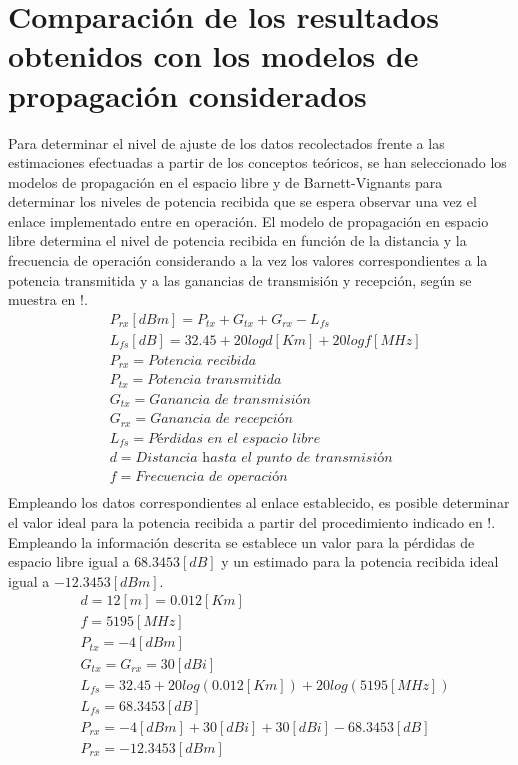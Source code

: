 \documentclass[conference]{IEEEtran}
\begin{document}
\section{Comparación de los resultados obtenidos con los modelos de propagación considerados}
Para determinar el nivel de ajuste de los datos recolectados frente a las estimaciones efectuadas a partir de 
los conceptos teóricos, se han seleccionado los modelos de propagación en el espacio libre y de Barnett-Vignants
para determinar los niveles de potencia recibida que se espera observar una vez el enlace implementado entre en operación.
El modelo de propagación en espacio libre determina el nivel de potencia recibida en función de la distancia y la 
frecuencia de operación considerando a la vez los valores correspondientes a la potencia transmitida y a las ganancias
de transmisión y recepción, según se muestra en !. 
\begin{equation}
    \label{eq:Eq4}
    \begin{aligned}
        &P_{rx}[dBm] = P_{tx} + G_{tx} + G_{rx} - L_{fs}\\
        &L_{fs}[dB] = 32.45+20logd[Km]+20logf[MHz]\\
        &P_{rx} = \textit{Potencia recibida}\\
        &P_{tx} = \textit{Potencia transmitida}\\
        &G_{tx} = \textit{Ganancia de transmisión}\\
        &G_{rx} = \textit{Ganancia de recepción}\\
        &L_{fs} = \textit{Pérdidas en el espacio libre}\\
        &d = \textit{Distancia hasta el punto de transmisión}\\
        &f = \textit{Frecuencia de operación}\\
    \end{aligned}
\end{equation}
Empleando los datos correspondientes al enlace establecido, es posible determinar el valor ideal para la potencia recibida 
a partir del procedimiento indicado en !. Empleando la información descrita se establece un valor para la pérdidas de espacio libre
igual a $68.3453[dB]$ y un estimado para la potencia recibida ideal igual a $-12.3453[dBm]$.
\begin{equation}
    \label{eq:Eq5}
    \begin{aligned}
        &d = 12[m] = 0.012[Km]\\
        &f = 5195[MHz]\\
        &P_{tx} = -4[dBm]\\
        &G_{tx} = G_{rx} = 30[dBi]\\
        &L_{fs} = 32.45+20log(0.012[Km])+20log(5195[MHz])\\
        &L_{fs} = 68.3453[dB]\\
        &P_{rx} = -4[dBm] + 30[dBi] + 30[dBi] - 68.3453[dB]\\
        &P_{rx} = -12.3453[dBm]
    \end{aligned}
\end{equation}
\end{document}
